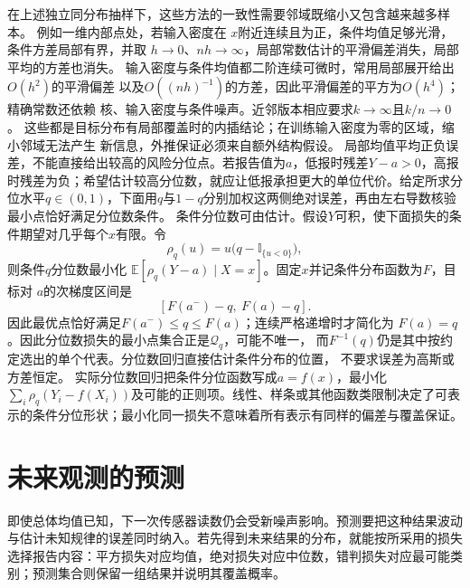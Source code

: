 在上述独立同分布抽样下，这些方法的一致性需要邻域既缩小又包含越来越多样本。
例如一维内部点处，若输入密度在
\(x\)附近连续且为正，条件均值足够光滑，条件方差局部有界，并取
\(h\to0\)、\(nh\to\infty\)，局部常数估计的平滑偏差消失，局部平均的方差也消失。
输入密度与条件均值都二阶连续可微时，常用局部展开给出\(O(h^2)\)的平滑偏差
以及\(O((nh)^{-1})\)的方差，因此平滑偏差的平方为\(O(h^4)\)；精确常数还依赖
核、输入密度与条件噪声。近邻版本相应要求\(k\to\infty\)且\(k/n\to0\)。
这些都是目标分布有局部覆盖时的内插结论；在训练输入密度为零的区域，缩小邻域无法产生
新信息，外推保证必须来自额外结构假设。
局部均值平均正负误差，不能直接给出较高的风险分位点。若报告值为\(a\)，低报时残差\(Y-a>0\)，高报时残差为负；希望估计较高分位数，就应让低报承担更大的单位代价。给定所求分位水平\(q\in(0,1)\)，下面用\(q\)与\(1-q\)分别加权这两侧绝对误差，再由左右导数核验最小点恰好满足分位数条件。
条件分位数可由估计。假设\(Y\)可积，使下面损失的条件期望对几乎每个\(x\)有限。令
\[
  \rho_q(u)=u\bigl(q-\mathbb{I}_{\{u<0\}}\bigr),
\]
则条件\(q\)分位数最小化
\(\mathbb{E}[\rho_q(Y-a)\mid X=x]\)。固定\(x\)并记条件分布函数为\(F\)，目标对
\(a\)的次梯度区间是
\[
  [F(a^-)-q,\ F(a)-q].
\]
因此最优点恰好满足\(F(a^-)\leq q\leq F(a)\)；连续严格递增时才简化为
\(F(a)=q\)。因此分位数损失的最小点集合正是\(\mathcal Q_q\)，可能不唯一，
而\(F^{-1}(q)\)仍是其中按约定选出的单个代表。分位数回归直接估计条件分布的位置，
不要求误差为高斯或方差恒定。
实际分位数回归把条件分位函数写成\(a=f(x)\)，最小化
\(\sum_i\rho_q(Y_i-f(X_i))\)及可能的正则项。线性、样条或其他函数类限制决定了可表示的条件分位形状；最小化同一损失不意味着所有表示有同样的偏差与覆盖保证。

\section{未来观测的预测}
\label{sec:stats-prediction-observation-limits}
即使总体均值已知，下一次传感器读数仍会受新噪声影响。预测要把这种结果波动与估计未知规律的误差同时纳入。若先得到未来结果的分布，就能按所采用的损失选择报告内容：平方损失对应均值，绝对损失对应中位数，错判损失对应最可能类别；预测集合则保留一组结果并说明其覆盖概率。

